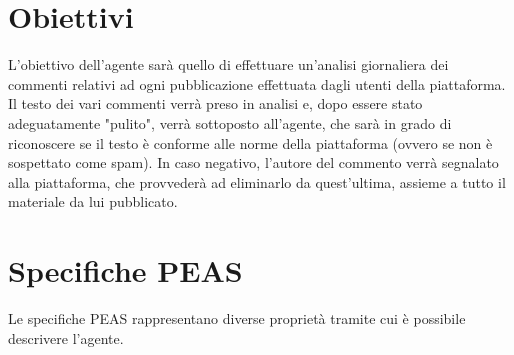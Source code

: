 \documentclass{report} %
\begin{document}
    \section{Obiettivi}
    L'obiettivo dell'agente sarà quello di effettuare un'analisi giornaliera dei commenti relativi ad ogni pubblicazione effettuata dagli utenti della piattaforma.
    Il testo dei vari commenti verrà preso in analisi e, dopo essere stato adeguatamente "pulito", verrà sottoposto all'agente, che sarà in grado di riconoscere se il 
    testo è conforme alle norme della piattaforma (ovvero se non è sospettato come spam). \newline
    In caso negativo, l'autore del commento verrà segnalato alla piattaforma, che provvederà ad eliminarlo da quest'ultima, assieme a tutto il materiale da lui pubblicato.

    \section{Specifiche PEAS}
    Le specifiche PEAS rappresentano diverse proprietà tramite cui è possibile descrivere l'agente. \newline
\end{document}

